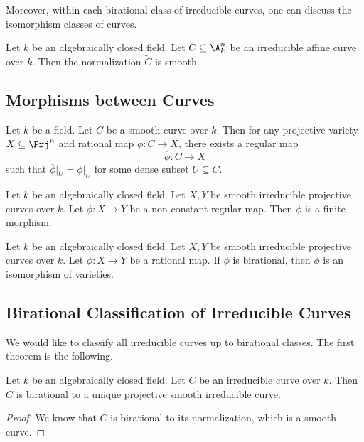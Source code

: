 \documentclass[a4paper]{article}
\begin{document}
Moreover, within each birational class of irreducible curves, one can discuss the isomorphism classes of curves. 

\begin{crl}{}{} Let $k$ be an algebraically closed field. Let $C\subseteq\A_k^n$ be an irreducible affine curve over $k$. Then the normalization $\widetilde{C}$ is smooth. 
\end{crl}

\subsection{Morphisms between Curves}
\begin{prp}{}{} Let $k$ be a field. Let $C$ be a smooth curve over $k$. Then for any projective variety $X\subseteq\Prj^n$ and rational map $\phi:C\to X$, there exists a regular map $$\overline{\phi}:C\to X$$ such that $\overline{\phi}|_U=\phi|_U$ for some dense subset $U\subseteq C$. 
\end{prp}

\begin{prp}{}{} Let $k$ be an algebraically closed field. Let $X,Y$ be smooth irreducible projective curves over $k$. Let $\phi:X\to Y$ be a non-constant regular map. Then $\phi$ is a finite morphism. 
\end{prp}

\begin{prp}{}{} Let $k$ be an algebraically closed field. Let $X,Y$ be smooth irreducible projective curves over $k$. Let $\phi:X\to Y$ be a rational map. If $\phi$ is birational, then $\phi$ is an isomorphism of varieties. 
\end{prp}

\subsection{Birational Classification of Irreducible Curves}
We would like to classify all irreducible curves up to birational classes. The first theorem is the following. 

\begin{thm}{}{} Let $k$ be an algebraically closed field. Let $C$ be an irreducible curve over $k$. Then $C$ is birational to a unique projective smooth irreducible curve. \tcbline
\begin{proof}
We know that $C$ is birational to its normalization, which is a smooth curve. 
\end{proof}
\end{thm}
\end{document}
